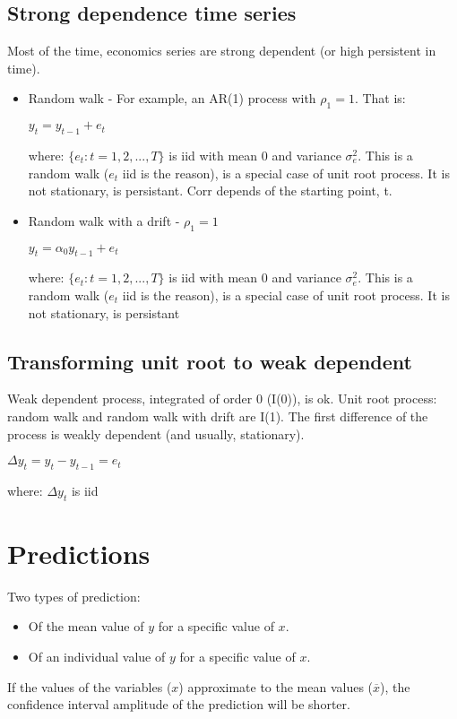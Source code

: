 \documentclass[10pt, a4paper, landscape]{extarticle}
\begin{document}
\begin{multicols}{3}
	\subsection*{Strong dependence time series}
		Most of the time, economics series are strong dependent (or high persistent in time).
		\begin{itemize}[leftmargin=*]
			\item Random walk -	For example, an AR(1) process with $\rho_1 = 1$. That is:
			\begin{center}
				$y_t = y_{t-1} + e_t$
			\end{center}
			where: $\lbrace e_t : t = 1, 2, ..., T \rbrace$ is iid with mean 0 and variance $\sigma^2_e$. This is a random walk ($e_t$ iid is the reason), is a special case of unit root process. It is not stationary, is persistant. Corr depends of the starting point, t.
			\item Random walk with a drift - $\rho_1 = 1$
			\begin{center}
				$y_t = \alpha_0 y_{t-1} + e_t$
			\end{center}
			where: $\lbrace e_t : t = 1, 2, ..., T \rbrace$ is iid with mean 0 and variance $\sigma^2_e$. This is a random walk ($e_t$ iid is the reason), is a special case of unit root process. It is not stationary, is persistant
		\end{itemize}

	\subsection*{Transforming unit root to weak dependent}
		Weak dependent process, integrated of order 0 (I(0)), is ok. Unit root process: random walk and random walk with drift are I(1). The first difference of the process is weakly dependent (and usually, stationary).
		\begin{center}
			$\Delta y_t = y_t - y_{t-1} = e_t$
		\end{center}
		where: $\Delta y_t$  is iid

\columnbreak

\section*{Predictions}
	Two types of prediction:
	\begin{itemize}[leftmargin=*]
		\item Of the mean value of $y$ for a specific value of $x$.
		\item Of an individual value of $y$ for a specific value of $x$.
	\end{itemize}
	If the values of the variables ($x$) approximate to the mean values ($\overline{x}$), the confidence interval amplitude of the prediction will be shorter. 


\end{multicols}
\end{document}
